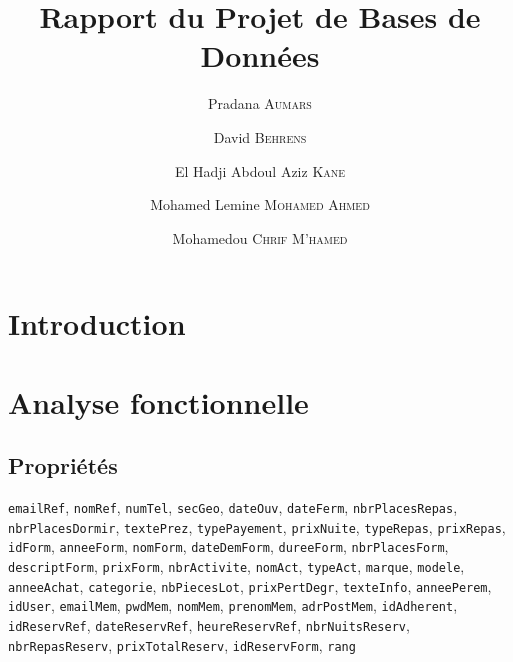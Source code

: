 \documentclass[12pt, a4paper]{article}
\title{Rapport du Projet de Bases de Données}
\author{Pradana \textsc{Aumars}
  \and
  David \textsc{Behrens}
  \and
  El Hadji Abdoul Aziz \textsc{Kane}
  \and
  Mohamed Lemine \textsc{Mohamed Ahmed}
  \and
  Mohamedou \textsc{Chrif M'hamed}}
\newcommand\att[1]{\textnhtt{#1}}
\begin{document}
\maketitle
\section{Introduction}
\section{Analyse fonctionnelle}
\subsection*{Propriétés}
\att{emailRef}, %
\att{nomRef}, %
\att{numTel}, %
\att{secGeo}, %
\att{dateOuv}, %
\att{dateFerm}, %
\att{nbrPlacesRepas}, %
\att{nbrPlacesDormir}, %
\att{textePrez}, %
\att{typePayement}, %
\att{prixNuite}, %
\att{typeRepas}, %
\att{prixRepas}, %
\att{idForm}, %
\att{anneeForm}, %
\att{nomForm}, %
\att{dateDemForm}, %
\att{dureeForm}, %
\att{nbrPlacesForm}, %
\att{descriptForm}, %
\att{prixForm}, %
\att{nbrActivite}, %
\att{nomAct}, %
\att{typeAct}, %
\att{marque}, %
\att{modele}, %
\att{anneeAchat}, %
\att{categorie}, %
\att{nbPiecesLot}, %
\att{prixPertDegr}, %
\att{texteInfo}, %
\att{anneePerem}, %
\att{idUser}, %
\att{emailMem}, %
\att{pwdMem}, %
\att{nomMem}, %
\att{prenomMem}, %
\att{adrPostMem}, %
\att{idAdherent}, %
\att{idReservRef}, %
\att{dateReservRef}, %
\att{heureReservRef}, %
\att{nbrNuitsReserv}, %
\att{nbrRepasReserv}, %
\att{prixTotalReserv}, %
\att{idReservForm}, %
\att{rang} %
\end{document}
